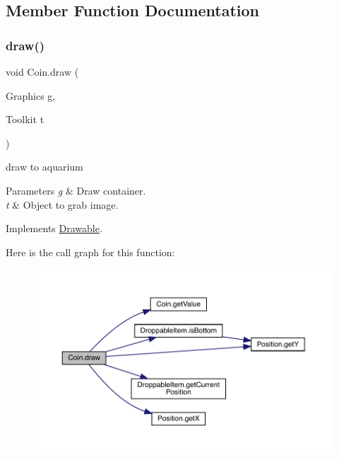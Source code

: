 \subsection{Member Function Documentation}
\mbox{\label{class_coin_ae0c35ffd80b39f26f43d287da0565d0b}} 
\subsubsection{\texorpdfstring{draw()}{draw()}}
{\footnotesize\ttfamily void Coin.\+draw (\begin{DoxyParamCaption}\item[{Graphics}]{g,  }\item[{Toolkit}]{t }\end{DoxyParamCaption})\hspace{0.3cm}{\ttfamily [inline]}}

draw to aquarium 
\begin{DoxyParams}{Parameters}
{\em g} & Draw container. \\
\hline
{\em t} & Object to grab image. \\
\hline
\end{DoxyParams}


Implements \mbox{\hyperlink{interface_drawable_aaddafb212b3c8e60fcc742052570c893}{Drawable}}.

Here is the call graph for this function\+:
\nopagebreak
\begin{figure}[H]
\begin{center}
\leavevmode
\includegraphics[width=350pt]{class_coin_ae0c35ffd80b39f26f43d287da0565d0b_cgraph}
\end{center}
\end{figure}
\mbox{\label{class_coin_a420e22e4740d8836be0beb3678bc6fe0}} 
